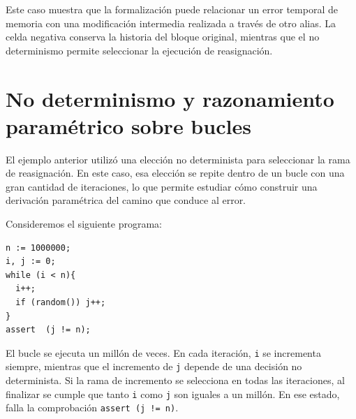 \documentclass[a4paper,	11pt]{report}
\begin{document}
Este caso muestra que la formalización puede relacionar un error temporal de memoria con una modificación intermedia realizada a través de otro alias.
La celda negativa conserva la historia del bloque original,
mientras que el no determinismo permite seleccionar la ejecución de reasignación.

\section{No determinismo y razonamiento paramétrico sobre bucles}
\label{sec:bucle}
El ejemplo anterior utilizó una elección no determinista para seleccionar la rama de reasignación.
En este caso,
esa elección se repite dentro de un bucle con una gran cantidad de iteraciones,
lo que permite estudiar cómo construir una derivación paramétrica del camino que conduce al error.

Consideremos el siguiente programa:

\begin{lstlisting}
n := 1000000;
i, j := 0;
while (i < n){
  i++;
  if (random()) j++;
}
assert  (j != n);
\end{lstlisting}
El bucle se ejecuta un millón de veces.
En cada iteración,
\lstinline|i| se incrementa siempre,
mientras que el incremento de \lstinline|j| depende de una decisión no determinista.
Si la rama de incremento se selecciona en todas las iteraciones,
al finalizar se cumple que tanto \lstinline|i| como \lstinline|j| son iguales a un millón.
En ese estado,
falla la comprobación \lstinline|assert (j != n)|.
\end{document}
